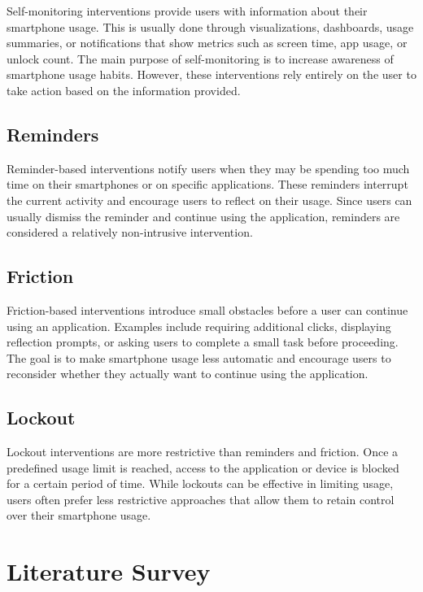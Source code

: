 \documentclass[11pt]{report}
\begin{document}
Self-monitoring interventions provide users with information about their smartphone usage. 
This is usually done through visualizations, dashboards, usage summaries, or notifications 
that show metrics such as screen time, app usage, or unlock count. The main purpose of 
self-monitoring is to increase awareness of smartphone usage habits. However, these 
interventions rely entirely on the user to take action based on the information provided.

\subsection{Reminders}

Reminder-based interventions notify users when they may be spending too much time on their 
smartphones or on specific applications. These reminders interrupt the current activity 
and encourage users to reflect on their usage. Since users can usually dismiss the 
reminder and continue using the application, reminders are considered a relatively 
non-intrusive intervention.

\subsection{Friction}

Friction-based interventions introduce small obstacles before a user can continue using 
an application. Examples include requiring additional clicks, displaying reflection 
prompts, or asking users to complete a small task before proceeding. The goal is to 
make smartphone usage less automatic and encourage users to reconsider whether they 
actually want to continue using the application.

\subsection{Lockout}

Lockout interventions are more restrictive than reminders and friction. Once a predefined 
usage limit is reached, access to the application or device is blocked for a certain 
period of time. While lockouts can be effective in limiting usage, users often prefer 
less restrictive approaches that allow them to retain control over their smartphone usage.


\section{Literature Survey}
\end{document}

